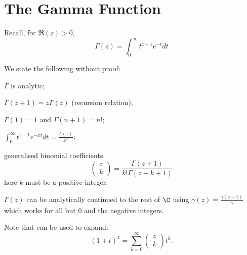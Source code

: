 \documentclass[../Main.tex]{subfiles}
\begin{document}
\section{The Gamma Function}
Recall, for $\Re(z) > 0$,
\begin{equation*}
    \Gamma(z) = \int_{0}^{\infty} t^{z-1} e^{-t} dt
\end{equation*}
\begin{propositions}{
        We state the following without proof:
        \label{propsGamma}
    }
    \item $\Gamma$ is analytic; \label{propGammaAnalytic}
    \item $\Gamma(z+1) = z\Gamma(z)$ (recursion relation); \label{propGammRecursion}
    \item $\Gamma(1) = 1$ and $\Gamma(n+1) = n!$; \label{propGammaFactorial}
    \item $\int_{0}^{\infty} t^{z-1} e^{-xt} dt = \frac{\Gamma(z)}{x^z}$; \label{propGammaExtended}
    \item generalised binomial coefficients:
        \begin{equation*}
            \begin{pmatrix}z \\ k\end{pmatrix} = \frac{\Gamma(z+1)}{k! \Gamma(z-k+1)}
        \end{equation*} 
        here $k$ must be a positive integer. \label{propGammaBinomial}
    \item $\Gamma(z)$ can be analytically continued to the rest of $\C$ using $\gamma(z) = \frac{\gamma(z+1)}{\gamma}$ which works for all but $0$ and the negative integers. \label{propGammaContinue}
\end{propositions}
Note that  can be used to expand:
\begin{equation*}
    (1 + t)^z = \sum_{k=0}^{\infty} \begin{pmatrix}z \\ k\end{pmatrix} t^k.
\end{equation*}
\end{document}
